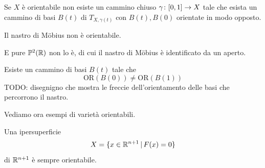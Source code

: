 \documentclass[a4paper]{article}
\begin{document}
Se \(X\) è orientabile non esiste un cammino chiuso
\(\gamma \colon [0,1] \to X\)
tale che esista un cammino di basi \(B(t)\)
di \(T_{X,\gamma(t)}\)
con \(B(t), B(0)\)
orientate in modo opposto.

\begin{snippetcorollary}{}
    Il nastro di Möbius non è orientabile.
\end{snippetcorollary}

E pure \(\mathbb P^2(\mathbb{R})\)
non lo è, di cui il nastro di Möbius è identificato da un aperto.

\begin{snippetproof}{}
    Esiste un cammino di basi \(B(t)\) tale che \[
        \text{OR}(B(0))
        \neq \text{OR}(B(1))
    \]
    TODO: disegnigno che mostra le freccie dell'orientamento delle basi che percorrono il nastro.
\end{snippetproof}

Vediamo ora esempi di varietà orientabili.

\begin{snippetproposition}{}
    Una ipersuperficie
    \[
        X = \{
            x \in \mathbb{R}^{n+1}
            \,|\, F(x) = 0    
        \}
    \]
    di \(\mathbb{R}^{n+1}\)
    è sempre orientabile.
\end{snippetproposition}
\end{document}
